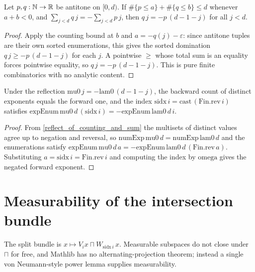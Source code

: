 \begin{proposition}\label{reflect_of_counting_and_sum}
  \leanok
  Let \(p, q : \mathbb{N} \to \mathbb{R}\) be antitone on \([0,d)\). If \(\#\{p \le a\} + \#\{q \le b\} \le d\) whenever \(a + b < 0\), and \(\sum_{j<d} q\,j = -\sum_{j<d} p\,j\), then \(q\,j = -p\,(d-1-j)\) for all \(j < d\).
\end{proposition}
\begin{proof}\leanok
  Apply the counting bound at \(b\) and \(a = -q(j) - \varepsilon\): since antitone tuples are their own sorted enumerations, this gives the sorted domination \(q\,j \ge -p\,(d-1-j)\) for each \(j\). A pointwise \(\ge\) whose total sum is an equality forces pointwise equality, so \(q\,j = -p\,(d-1-j)\). This is pure finite combinatorics with no analytic content.
\end{proof}

\begin{corollary}\label{sidx_exp}
  \leanok
  Under the reflection \(\mathrm{mu0}\,j = -\mathrm{lam0}\,(d-1-j)\), the backward count of distinct exponents equals the forward one, and the index \(\mathrm{sidx}\,i = \mathrm{cast}\,(\mathrm{Fin.rev}\,i)\) satisfies \(\mathrm{expEnum}\,\mathrm{mu0}\,d\,(\mathrm{sidx}\,i) = -\mathrm{expEnum}\,\mathrm{lam0}\,d\,i\).
\end{corollary}
\begin{proof}\leanok
  From \cref{reflect_of_counting_and_sum} the multisets of distinct values agree up to negation and reversal, so \(\mathrm{numExp}\,\mathrm{mu0}\,d = \mathrm{numExp}\,\mathrm{lam0}\,d\) and the enumerations satisfy \(\mathrm{expEnum}\,\mathrm{mu0}\,d\,a = -\mathrm{expEnum}\,\mathrm{lam0}\,d\,(\mathrm{Fin.rev}\,a)\). Substituting \(a = \mathrm{sidx}\,i = \mathrm{Fin.rev}\,i\) and computing the index by \(\mathrm{omega}\) gives the negated forward exponent.
\end{proof}

\section{Measurability of the intersection bundle}

The split bundle is \(x \mapsto V_i x \sqcap W_{\mathrm{sidx}\,i}\,x\). Measurable subspaces do not close under \(\sqcap\) for free, and Mathlib has no alternating-projection theorem; instead a single von Neumann-style power lemma supplies measurability.

